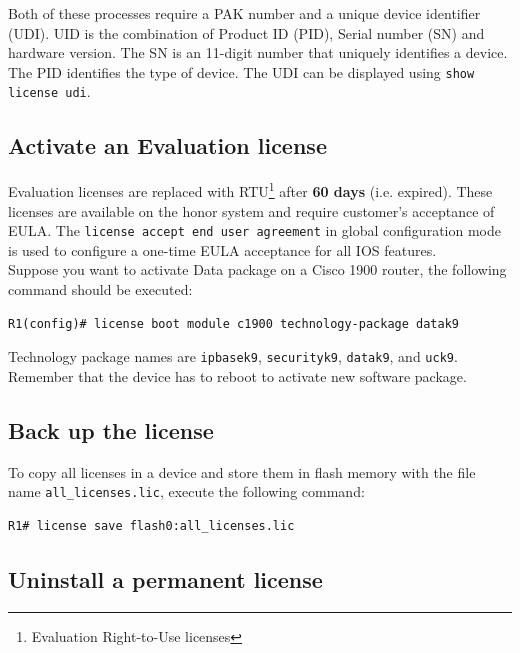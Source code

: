 Both of these processes require a PAK number and a unique device identifier (UDI). UID is the combination of Product ID (PID), Serial number (SN) and hardware version. The SN is an 11-digit number that uniquely identifies a device. The PID identifies the type of device. The UDI can be displayed using \verb|show license udi|.\\

\subsection{Activate an Evaluation license}

Evaluation licenses are replaced with RTU\footnote{Evaluation Right-to-Use licenses} after \textbf{60 days} (i.e. expired). These licenses are available on the honor system and require customer's acceptance of EULA. The \verb|license accept end user agreement| in global configuration mode is used to configure a one-time EULA acceptance for all IOS features. \\

Suppose you want to activate Data package on a Cisco 1900 router, the following command should be executed:

\begin{verbatim}
R1(config)# license boot module c1900 technology-package datak9
\end{verbatim}

Technology package names are \verb|ipbasek9|, \verb|securityk9|, \verb|datak9|, and \verb|uck9|.\\

Remember that the device has to reboot to activate new software package.

\subsection{Back up the license}

To copy all licenses in a device and store them in flash memory with the file name \verb|all_licenses.lic|, execute the following command:

\begin{verbatim}
R1# license save flash0:all_licenses.lic
\end{verbatim}

\subsection{Uninstall a permanent license}

